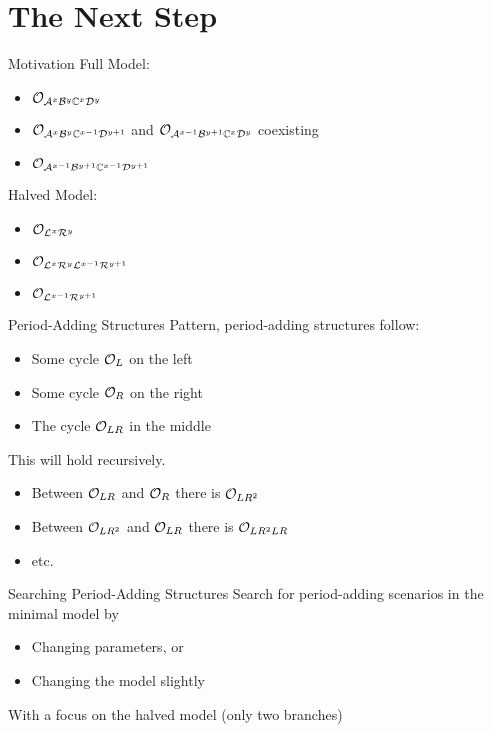 
\section{The Next Step}

\begin{frame}{Motivation}
    \vspace{-2.0em}
    Full Model:
    \begin{itemize}
        \item $\mathcal{O}_{\mathcal{A}^x\mathcal{B}^y\mathbb{C}^x\mathcal{D}^y}$
        \item $\mathcal{O}_{\mathcal{A}^x\mathcal{B}^y\mathbb{C}^{x-1}\mathcal{D}^{y+1}}$ and $\mathcal{O}_{\mathcal{A}^{x-1}\mathcal{B}^{y+1}\mathbb{C}^x\mathcal{D}^y}$ coexisting
        \item $\mathcal{O}_{\mathcal{A}^{x-1}\mathcal{B}^{y+1}\mathbb{C}^{x-1}\mathcal{D}^{y+1}}$
    \end{itemize}

    \vspace{1.0em}
    Halved Model:
    \begin{itemize}
        \item $\mathcal{O}_{\mathcal{L}^x\mathcal{R}^y}$
        \item $\mathcal{O}_{\mathcal{L}^x\mathcal{R}^y\mathcal{L}^{x-1}\mathcal{R}^{y+1}}$
        \item $\mathcal{O}_{\mathcal{L}^{x-1}\mathcal{R}^{y+1}}$
    \end{itemize}
\end{frame}

\begin{frame}{Period-Adding Structures}
    \vspace{-2.0em}
    Pattern, period-adding structures follow:
    \begin{itemize}
        \item Some cycle $\mathcal{O}_{L}$ on the left
        \item Some cycle $\mathcal{O}_{R}$ on the right
        \item The cycle $\mathcal{O}_{LR}$ in the middle
    \end{itemize}

    \vspace{1.0em}
    This will hold recursively.
    \begin{itemize}
        \item Between $\mathcal{O}_{LR}$ and $\mathcal{O}_{R}$ there is $\mathcal{O}_{LR^2}$
        \item Between $\mathcal{O}_{LR^2}$ and $\mathcal{O}_{LR}$ there is $\mathcal{O}_{LR^2LR}$
        \item etc.
    \end{itemize}
\end{frame}

\begin{frame}{Searching Period-Adding Structures}
    Search for period-adding scenarios in the minimal model by
    \begin{itemize}
        \item Changing parameters, or
        \item Changing the model slightly
    \end{itemize}

    \vspace{1em}
    With a focus on the halved model (only two branches)
\end{frame}